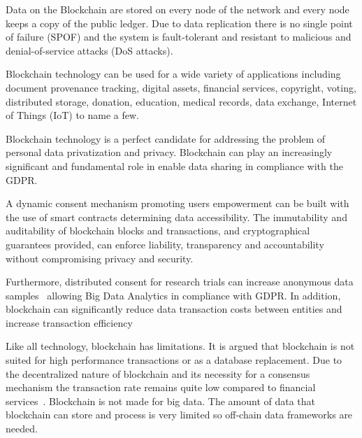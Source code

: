 Data on the Blockchain are stored on every node of the network and every node keeps a copy of the public ledger. Due to data replication there is no single point of failure (SPOF) and the system is fault-tolerant and resistant to malicious and denial-of-service attacks (DoS attacks).

Blockchain technology can be used for a wide variety of applications including document provenance tracking, digital assets, financial services, copyright, voting, distributed storage, donation, education, medical records, data exchange, Internet of Things (IoT) to name a few.

Blockchain technology is a perfect candidate for addressing the problem of personal data privatization and privacy. Blockchain can play an increasingly significant and fundamental role in enable data sharing in compliance with the GDPR.

A dynamic consent mechanism promoting users empowerment can be built with the use of smart contracts determining data accessibility. The immutability and auditability of blockchain blocks and transactions, and cryptographical guarantees provided, can enforce liability, transparency and accountability without compromising privacy and security.

Furthermore, distributed consent for research trials can increase anonymous data samples~\cite{ibm} allowing Big Data Analytics in compliance with GDPR. In addition, blockchain can significantly reduce data transaction costs between entities and increase transaction efficiency

Like all technology, blockchain has limitations. It is argued that blockchain is not suited for high performance transactions or as a database replacement. Due to the decentralized nature of blockchain and its necessity for a consensus mechanism the transaction rate remains quite low compared to financial services~\cite{Sompolinsky2015, Zohar:2015:BUH:2817191.2701411}. Blockchain is not made for big data. The amount of data that blockchain can store and process is very limited so off-chain data frameworks are needed.
